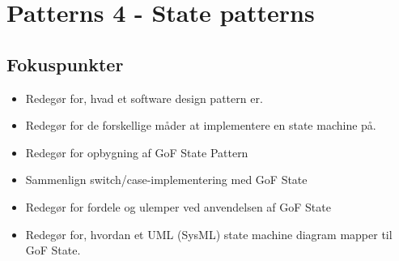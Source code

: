 \section{Patterns 4 - State patterns}

\subsection{Fokuspunkter}

\begin{itemize}
	\item Redegør for, hvad et software design pattern er.
	\item Redegør for de forskellige måder at implementere en state machine på.
	\item Redegør for opbygning af GoF State Pattern
	\item Sammenlign  switch/case-implementering med GoF State
	\item Redegør for fordele og ulemper ved anvendelsen af GoF State
	\item Redegør for, hvordan et UML (SysML) state machine diagram mapper til GoF State.
\end{itemize}
